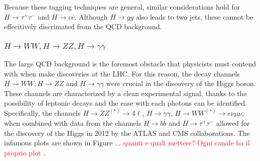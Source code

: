 \documentclass[10pt,a4paper]{book}
\newcommand\todo[1]{\textcolor{red}{#1}}
\begin{document}
Because these tagging techniques are general, similar considerations hold for $H \rightarrow \tau^+ \tau^-$ and $H \rightarrow c \overline{c}$. Although $H \rightarrow g g$ also leads to two jets, these cannot be effecitively discrimated from the QCD background.

\subsubsection{$H\rightarrow WW, H\rightarrow ZZ, H\rightarrow \gamma\gamma$}
The large QCD background is the foremost obstacle that physicists must contend with when make discoveries at the LHC. For this reason, the decay channels  
$H\rightarrow WW, H\rightarrow ZZ$ and $H\rightarrow \gamma\gamma$ were crucial in the discovery of the Higgs boson. These channels are characterized by a clean experimental signal, thanks to the possibility of leptonic decays and the ease with each photons can be identified. Specifically, the channels $H\rightarrow ZZ^{(*)}\rightarrow 4\ell$, $H\rightarrow\gamma\gamma$, $H\rightarrow WW^{(*)} \rightarrow e\nu\mu\nu$, when combined with data from the channels $H\rightarrow b\overline{b}$ and $H \rightarrow \tau^+ \tau^-$ allowed for the discovery of the Higgs in 2012 by the ATLAS and CMS collaborations. The infamous plots are shown in Figure ... \todo{quanti e quali mettere? Ogni canale ha il proprio plot} .
\end{document}
